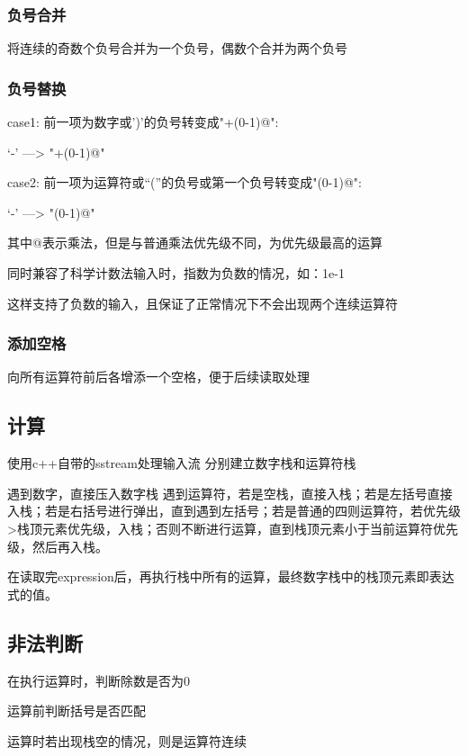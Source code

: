 \documentclass[UTF8]{ctexart}
\begin{document}
\subsubsection{负号合并}
将连续的奇数个负号合并为一个负号，偶数个合并为两个负号

\subsubsection{负号替换}
case1: 前一项为数字或')'的负号转变成"+(0-1)@":

\begin{center}
 			‘-’   --->   "+(0-1)@"
\end{center}

case2: 前一项为运算符或“(”的负号或第一个负号转变成"(0-1)@":

\begin{center}
			 ‘-’   --->   "(0-1)@"
\end{center}

其中@表示乘法，但是与普通乘法优先级不同，为优先级最高的运算

同时兼容了科学计数法输入时，指数为负数的情况，如：1e-1

这样支持了负数的输入，且保证了正常情况下不会出现两个连续运算符

\subsubsection{添加空格}
向所有运算符前后各增添一个空格，便于后续读取处理

\subsection{计算}
使用c++自带的sstream处理输入流
分别建立数字栈和运算符栈

遇到数字，直接压入数字栈
遇到运算符，若是空栈，直接入栈；若是左括号直接入栈；若是右括号进行弹出，直到遇到左括号；若是普通的四则运算符，若优先级>栈顶元素优先级，入栈；否则不断进行运算，直到栈顶元素小于当前运算符优先级，然后再入栈。

在读取完expression后，再执行栈中所有的运算，最终数字栈中的栈顶元素即表达式的值。
\subsection{非法判断}
在执行运算时，判断除数是否为0

运算前判断括号是否匹配

运算时若出现栈空的情况，则是运算符连续
\end{document}
